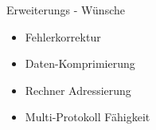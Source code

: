 \documentclass[beamer]{uibk}
\begin{document}
\begin{frame}{Erweiterungs - Wünsche}
  \begin{itemize}
    \item Fehlerkorrektur
    \item Daten-Komprimierung
    \item Rechner Adressierung
    \item Multi-Protokoll Fähigkeit
  \end{itemize}

\end{frame}
\end{document}
